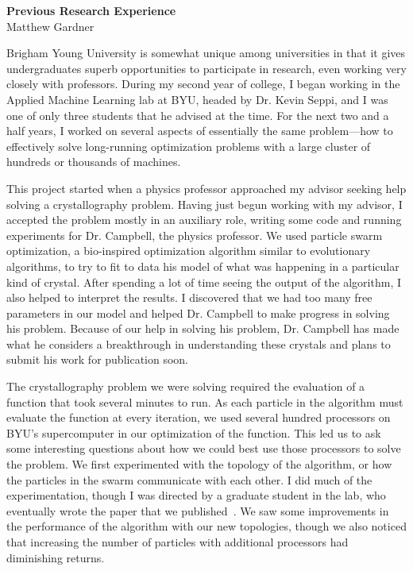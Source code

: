 \documentclass[onecolumn, 12pt]{article}
\begin{document}
\pagestyle{empty}

\begin{center}
  \textbf{Previous Research Experience}\\
  Matthew Gardner
\end{center}
\vspace{-4mm}

Brigham Young University is somewhat unique among universities in that it gives
undergraduates superb opportunities to participate in research, even working
very closely with professors.  During my second year of college, I began
working in the Applied Machine Learning lab at BYU, headed by Dr. Kevin Seppi,
and I was one of only three students that he advised at the time.  For the next
two and a half years, I worked on several aspects of essentially the same
problem---how to effectively solve long-running optimization problems with a
large cluster of hundreds or thousands of machines.

This project started when a physics professor approached my advisor seeking
help solving a crystallography problem.  Having just begun working with my
advisor, I accepted the problem mostly in an auxiliary role, writing some code
and running experiments for Dr. Campbell, the physics professor.  We used
particle swarm optimization, a bio-inspired optimization algorithm similar to
evolutionary algorithms, to try to fit to data his model of what was happening
in a particular kind of crystal.  After spending a lot of time seeing the
output of the algorithm, I also helped to interpret the results.  I discovered
that we had too many free parameters in our model and helped Dr. Campbell to
make progress in solving his problem.  Because of our help in solving his
problem, Dr. Campbell has made what he considers a breakthrough in
understanding these crystals and plans to submit his work for publication soon.

The crystallography problem we were solving required the evaluation of a
function that took several minutes to run.  As each particle in the algorithm
must evaluate the function at every iteration, we used several hundred
processors on BYU's supercomputer in our optimization of the function.  This
led us to ask some interesting questions about how we could best use those
processors to solve the problem.  We first experimented with the topology of
the algorithm, or how the particles in the swarm communicate with each other.
I did much of the experimentation, though I was directed by a graduate student
in the lab, who eventually wrote the paper that we
published~\cite{mcnabb-2009-large-particle-swarms}.  We saw some improvements
in the performance of the algorithm with our new topologies, though we also
noticed that increasing the number of particles with additional processors had
diminishing returns.
\end{document}
